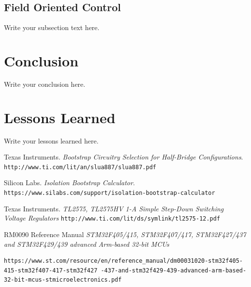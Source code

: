 \documentclass{article}
\begin{document}
		\subsection{Field Oriented Control}
		Write your subsection text here.
	
	\section{Conclusion}
	Write your conclusion here.
	
	\section{Lessons Learned}
	Write your lessons learned here.
	
	
	
	
	\begin{thebibliography}{9}
		Texas Instruments.
		\textit{Bootstrap Circuitry Selection for Half-Bridge Configurations}.
		\\\texttt{http://www.ti.com/lit/an/slua887/slua887.pdf}
		
		Silicon Labs. 
		\textit{Isolation Bootstrap Calculator}. 
		\\\texttt{https://www.silabs.com/support/isolation-bootstrap-calculator}
		
		Texas Instruments.
		\textit{TL2575, TL2575HV 1-A Simple Step-Down Switching Voltage Regulators}
		\texttt{http://www.ti.com/lit/ds/symlink/tl2575-12.pdf}
		
		
		RM0090 Reference Manual
		\textit{STM32F405/415, STM32F407/417, STM32F427/437 and STM32F429/439 advanced Arm-based 32-bit MCUs}
		
		\texttt{https://www.st.com/resource/en/reference\_manual/dm00031020-stm32f405-415-stm32f407-417-stm32f427
			-437-and-stm32f429-439-advanced-arm-based-32-bit-mcus-stmicroelectronics.pdf}
		
		
	\end{thebibliography}
	
	
	
\end{document}
